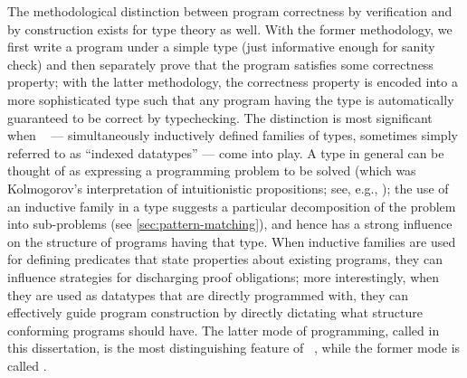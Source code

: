 The methodological distinction between program correctness by verification and by construction exists for type theory as well.
With the former methodology, we first write a program under a simple type (just informative enough for sanity check) and then separately prove that the program satisfies some correctness property; with the latter methodology, the correctness property is encoded into a more sophisticated type such that any program having the type is automatically guaranteed to be correct by typechecking.
The distinction is most significant when ~\citep{Dybjer-inductive-families} --- simultaneously inductively defined families of types, sometimes simply referred to as ``indexed datatypes'' --- come into play.
A type in general can be thought of as expressing a programming problem to be solved (which was Kolmogorov's interpretation of intuitionistic propositions; see, e.g., \citet{ML-truth-of-a-proposition}); the use of an inductive family in a type suggests a particular decomposition of the problem into sub-problems (see \autoref{sec:pattern-matching}), and hence has a strong influence on the structure of programs having that type.
When inductive families are used for defining predicates that state properties about existing programs, they can influence strategies for discharging proof obligations; more interestingly, when they are used as datatypes that are directly programmed with, they can effectively guide program construction by directly dictating what structure conforming programs should have.
The latter mode of programming, called  in this dissertation, is the most distinguishing feature of ~\citep{McBride-Epigram, Altenkirch-why-dependent-types-matter}, while the former mode is called .

